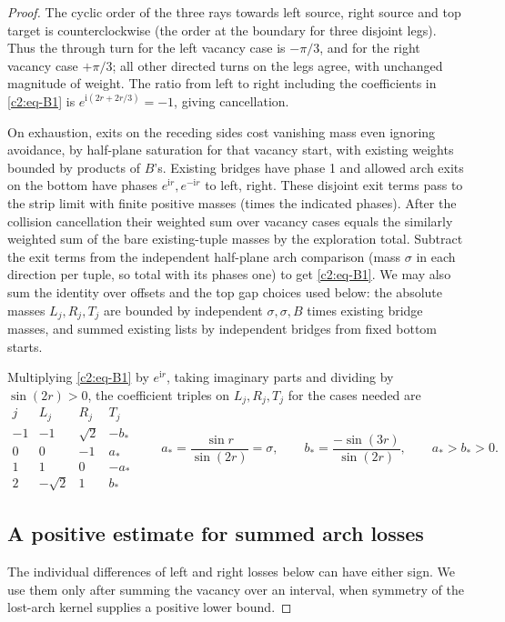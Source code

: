 \begin{proof}
The cyclic order of the three rays towards left source, right source and top target is counterclockwise (the order at the boundary for three disjoint legs). Thus the through turn for the left vacancy case is \(-\pi/3\), and for the right vacancy case \(+\pi/3\); all other directed turns on the legs agree, with unchanged magnitude of weight. The ratio from left to right including the coefficients in \eqref{c2:eq-B1} is \(e^{\mathrm i(2r+2r/3)}=-1\), giving cancellation. 

On exhaustion, exits on the receding sides cost vanishing mass even ignoring avoidance, by half-plane saturation for that vacancy start, with existing weights bounded by products of \(B\)'s. Existing bridges have phase 1 and allowed arch exits on the bottom have phases \(e^{\mathrm i r},e^{-\mathrm i r}\) to left, right. These disjoint exit terms pass to the strip limit with finite positive masses (times the indicated phases). After the collision cancellation their weighted sum over vacancy cases equals the similarly weighted sum of the bare existing-tuple masses by the exploration total. Subtract the exit terms from the independent half-plane arch comparison (mass \(\sigma\) in each direction per tuple, so total with its phases one) to get \eqref{c2:eq-B1}. We may also sum the identity over offsets and the top gap choices used below: the absolute masses \(L_j,R_j,T_j\) are bounded by independent \(\sigma,\sigma,B\) times existing bridge masses, and summed existing lists by independent bridges from fixed bottom starts.

Multiplying \eqref{c2:eq-B1} by \(e^{\mathrm i r}\), taking imaginary parts and dividing by \(\sin(2r)>0\), the coefficient triples on \(L_j,R_j,T_j\) for the cases needed are
\[
\begin{array}{c|rrr}
 j & L_j & R_j & T_j\\ \hline
 -1&-1&\sqrt2&-b_*\\
 0&0&-1&a_*\\
 1&1&0&-a_*\\
 2&-\sqrt2&1&b_*
\end{array}
\qquad
 a_*=\frac{\sin r}{\sin(2r)}=\sigma,\qquad
 b_*=\frac{-\sin(3r)}{\sin(2r)},\qquad a_*>b_*>0.
\]

\subsection{A positive estimate for summed arch losses}
The individual differences of left and right losses below can have either
sign. We use them only after summing the vacancy over an interval, when
symmetry of the lost-arch kernel supplies a positive lower bound.


\end{proof}
